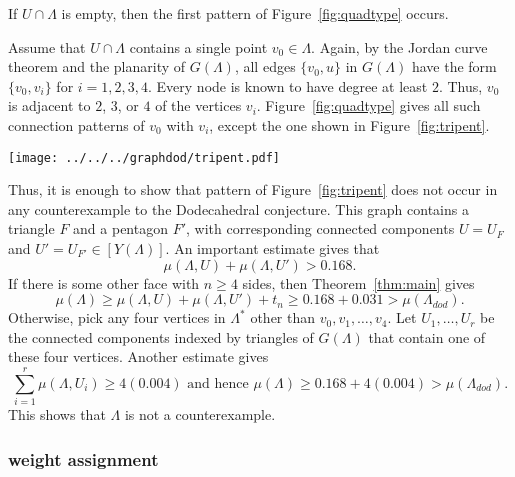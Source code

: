 If $U\cap\Lambda$ is empty, then the first pattern of Figure~\ref{fig:quadtype} occurs.

Assume that $U\cap\Lambda$ contains a single point $v_0\in\Lambda$.  Again, by
the Jordan curve theorem and the planarity of $G(\Lambda)$, 
all edges $\{v_0,u\}$ in $G(\Lambda)$ have the form
$\{v_0,v_i\}$ for $i=1,2,3,4$.  Every node is known to have degree
at least $2$.  Thus,  $v_0$ is adjacent to $2$, $3$, or $4$ of the vertices $v_i$.
Figure~\ref{fig:quadtype} gives all such connection patterns of $v_0$ with $v_i$, except
the one shown in Figure~\ref{fig:tripent}.  


\begin{floatingfigure}{25mm}
  \begin{center}
  \texttt{[image: ../../../graphdod/tripent.pdf]}
  \end{center}
  \caption{}
\label{fig:tripent}
\end{floatingfigure}




Thus, it is enough to show that pattern of Figure~\ref{fig:tripent} does not occur 
in any counterexample to the Dodecahedral conjecture.  This graph contains a triangle
$F$ and a pentagon $F'$, with corresponding connected components
$U=U_F$ and $U'=U_{F'}\in[Y(\Lambda)]$.
An important estimate \cite[Lemma~10.1]{arx} gives that
$$
\mu(\Lambda,U) + \mu(\Lambda,U') > 0.168.
$$
If there is some other face  with $n\ge 4$ sides, then 
Theorem~\ref{thm:main} gives
$$
\mu(\Lambda) \ge \mu(\Lambda,U)+\mu(\Lambda,U') + t_n \ge 0.168 + 0.031 > \mu(\Lambda_{dod}).
$$
Otherwise, pick any four vertices in $\Lambda^*$ other than $v_0,v_1,\ldots,v_4$.  Let $U_1,\ldots,U_r$ be the connected components
indexed by triangles of $G(\Lambda)$
that contain one of these four vertices.  
Another estimate \cite[Lemma~5.2]{arx} gives
$$
\sum_{i=1}^r \mu(\Lambda,U_i) \ge 4 (0.004) \text{ and hence }
\mu(\Lambda) \ge 0.168 + 4(0.004) > \mu(\Lambda_{dod}).
$$
This shows that $\Lambda$ is not a counterexample.


\subsubsection{weight assignment}

